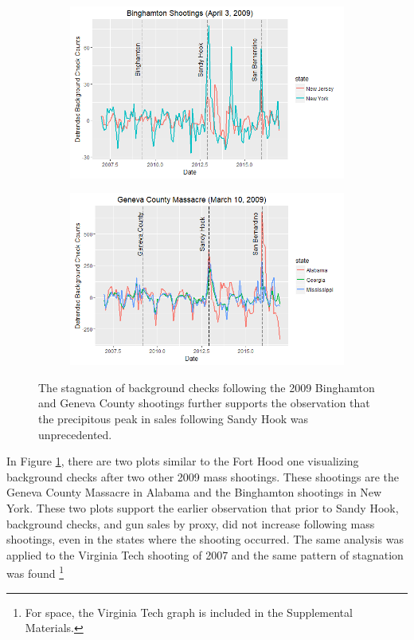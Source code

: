 \documentclass[9pt,twocolumn,twoside,lineno]{pnas-new}
\begin{document}
\begin{figure}%
\centering
\begin{subfigure}{.5\textwidth}
  \centering
  \includegraphics[width=\linewidth]{figures/binghamton}
\end{subfigure}%
\begin{subfigure}{.5\textwidth}
  \centering
  \includegraphics[width=\linewidth]{figures/geneva-county}
\end{subfigure}
\caption{The stagnation of background checks following the 2009 Binghamton and Geneva County shootings further supports the observation that the precipitous peak in sales following Sandy Hook was unprecedented.}
\label{fig:2009}
\end{figure}
In Figure \ref{fig:2009}, there are two plots similar to the Fort Hood one visualizing background checks after two other 2009 mass shootings. These shootings are the Geneva County Massacre in Alabama and the Binghamton shootings in New York. These two plots support the earlier observation that prior to Sandy Hook, background checks, and gun sales by proxy, did not increase following mass shootings, even in the states where the shooting occurred. The same analysis was applied to the Virginia Tech shooting of 2007 and the same pattern of stagnation was found \footnote{For space, the Virginia Tech graph is included in the Supplemental Materials.}
\end{document}
